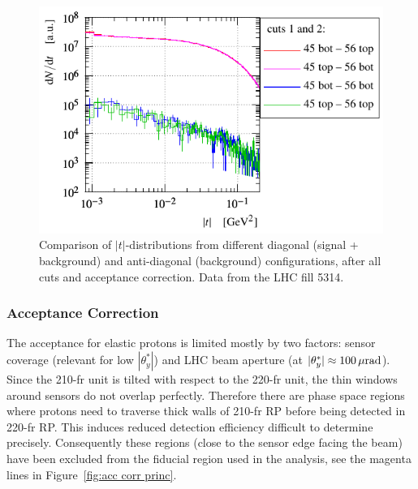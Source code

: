 \begin{figure}
\begin{center}
\includegraphics{fig/t_dist_antidgn_cmp.pdf}
\caption{%
Comparison of $|t|$-distributions from different diagonal (signal + background) and anti-diagonal (background) configurations, after all cuts and acceptance correction. Data from the LHC fill 5314.
}
\label{fig:tag bckg dist}
\end{center}
\end{figure}




\subsubsection{Acceptance Correction}
\label{sec:acc corr}

The acceptance for elastic protons is limited mostly by two factors: sensor coverage (relevant for low $|\theta^*_y|$) and LHC beam aperture (at $|\theta^*_y| \approx 100\,{\rm \mu rad}$). Since the 210-fr unit is tilted with respect to the 220-fr unit, the thin windows around sensors do not overlap perfectly. Therefore there are phase space regions where protons need to traverse thick walls of 210-fr RP before being detected in 220-fr RP. This induces reduced detection efficiency difficult to determine precisely. Consequently these regions (close to the sensor edge facing the beam) have been excluded from the fiducial region used in the analysis, see the magenta lines in Figure~\ref{fig:acc corr princ}.

